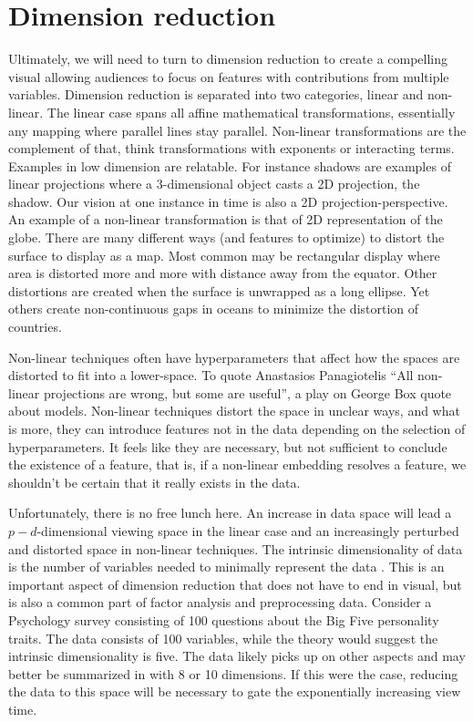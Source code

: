 \documentclass{template/monashthesis}
\begin{document}
\hypertarget{dimension-reduction}{%
\section{Dimension reduction}\label{dimension-reduction}}

Ultimately, we will need to turn to dimension reduction to create a compelling visual allowing audiences to focus on features with contributions from multiple variables. Dimension reduction is separated into two categories, linear and non-linear. The linear case spans all affine mathematical transformations, essentially any mapping where parallel lines stay parallel. Non-linear transformations are the complement of that, think transformations with exponents or interacting terms. Examples in low dimension are relatable. For instance shadows are examples of linear projections where a 3-dimensional object casts a 2D projection, the shadow. Our vision at one instance in time is also a 2D projection-perspective. An example of a non-linear transformation is that of 2D representation of the globe. There are many different ways (and features to optimize) to distort the surface to display as a map. Most common may be rectangular display where area is distorted more and more with distance away from the equator. Other distortions are created when the surface is unwrapped as a long ellipse. Yet others create non-continuous gaps in oceans to minimize the distortion of countries.

Non-linear techniques often have hyperparameters that affect how the spaces are distorted to fit into a lower-space. To quote Anastasios Panagiotelis ``All non-linear projections are wrong, but some are useful'', a play on George Box quote about models. Non-linear techniques distort the space in unclear ways, and what is more, they can introduce features not in the data depending on the selection of hyperparameters. It feels like they are necessary, but not sufficient to conclude the existence of a feature, that is, if a non-linear embedding resolves a feature, we shouldn't be certain that it really exists in the data.

Unfortunately, there is no free lunch here. An increase in data space will lead a \(p-d\)-dimensional viewing space in the linear case and an increasingly perturbed and distorted space in non-linear techniques. The intrinsic dimensionality of data is the number of variables needed to minimally represent the data \autocite{grinstein_high-dimensional_2002}. This is an important aspect of dimension reduction that does not have to end in visual, but is also a common part of factor analysis and preprocessing data. Consider a Psychology survey consisting of 100 questions about the Big Five personality traits. The data consists of 100 variables, while the theory would suggest the intrinsic dimensionality is five. The data likely picks up on other aspects and may better be summarized in with 8 or 10 dimensions. If this were the case, reducing the data to this space will be necessary to gate the exponentially increasing view time.
\end{document}
